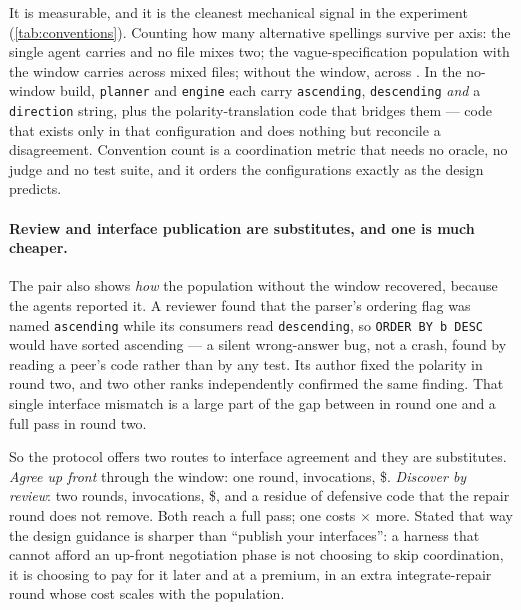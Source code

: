 \documentclass[10pt,twocolumn]{article}
\theoremstyle{definition}
\theoremstyle{plain}
\newcommand{\code}[1]{\texttt{\small #1}}
\begin{document}
\begin{table}[t]
\centering\scriptsize

\caption{Distinct spellings of the same idea surviving in the delivered source, over three
naming axes the agents themselves reported disagreeing about. Monotone in coordination:
one author converges on one spelling, eight with a shared window on
\NConvVagueShared, eight without on \NConvVagueNoshared.}
\label{tab:conventions}
\end{table}

It is measurable, and it is the cleanest mechanical signal in the experiment
(\cref{tab:conventions}). Counting how many alternative spellings survive per axis: the
single agent carries \NConvSolo{} and no file mixes two; the vague-specification
population with the window carries \NConvVagueShared{} across
\NConvMixedVagueShared{} mixed files; without the window, \NConvVagueNoshared{} across
\NConvMixedVagueNoshared. In the no-window build, \code{planner} and \code{engine} each
carry \code{ascending}, \code{descending} \emph{and} a \code{direction} string, plus the
polarity-translation code that bridges them --- code that exists only in that
configuration and does nothing but reconcile a disagreement. Convention count is a
coordination metric that needs no oracle, no judge and no test suite, and it orders the
configurations exactly as the design predicts.

\paragraph{Review and interface publication are substitutes, and one is much cheaper.}
The pair also shows \emph{how} the population without the window recovered, because the
agents reported it. A reviewer found that the parser's ordering flag was named
\code{ascending} while its consumers read \code{descending}, so \code{ORDER BY b DESC}
would have sorted ascending --- a silent wrong-answer bug, not a crash, found by reading
a peer's code rather than by any test. Its author fixed the polarity in round two, and
two other ranks independently confirmed the same finding. That single interface mismatch
is a large part of the gap between \NVagueNosRoundOne{} in round one and a full pass in
round two.

So the protocol offers two routes to interface agreement and they are substitutes.
\emph{Agree up front} through the window: one round, \NVagueSharedCalls{} invocations,
\$\NVagueSharedUsd. \emph{Discover by review}: two rounds,
\NVagueNosCalls{} invocations, \$\NVagueNosUsd, and a residue of defensive code that the
repair round does not remove. Both reach a full pass; one costs
\NVaguePriceRatio$\times$ more. Stated that way the design guidance is sharper than
``publish your interfaces'': a harness that cannot afford an up-front negotiation phase
is not choosing to skip coordination, it is choosing to pay for it later and at a
premium, in an extra integrate-repair round whose cost scales with the population.
\end{document}
